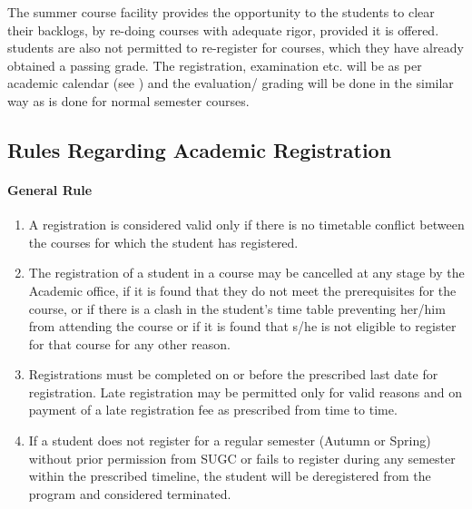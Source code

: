    The summer course facility provides the opportunity to the \glspl{student} to clear their backlogs, by re-doing courses with adequate rigor, provided it is offered. \Glspl{student} are also not permitted to re-register for courses, which they have already obtained a passing grade. The registration, examination etc. will be as per academic calendar (see ) and the evaluation/ grading will be done in the similar way as is done for normal semester courses. 

\subsection{Rules Regarding Academic Registration}

\paragraph{General Rule}

\begin{enumerate}[leftmargin=15mm]
    \item A registration is considered valid only if there is no timetable conflict between the courses for which the student has registered. 
    \item The registration of a student in a course may be cancelled at any stage by the Academic office, if it is found that they do not meet the prerequisites for the course, or if there is a clash in the student's time table preventing her/him from attending the course or if it is found that s/he is not eligible to register for that course for any other reason.
    \item Registrations must be completed on or before the prescribed last date for registration. Late registration may be permitted only for valid reasons and on payment of a late registration fee as prescribed from time to time. 
    \item If a student does not register for a regular semester (Autumn or Spring) without prior permission from SUGC or fails to register during any semester within the prescribed timeline, the student will be deregistered from the program and considered terminated.
\end{enumerate}

